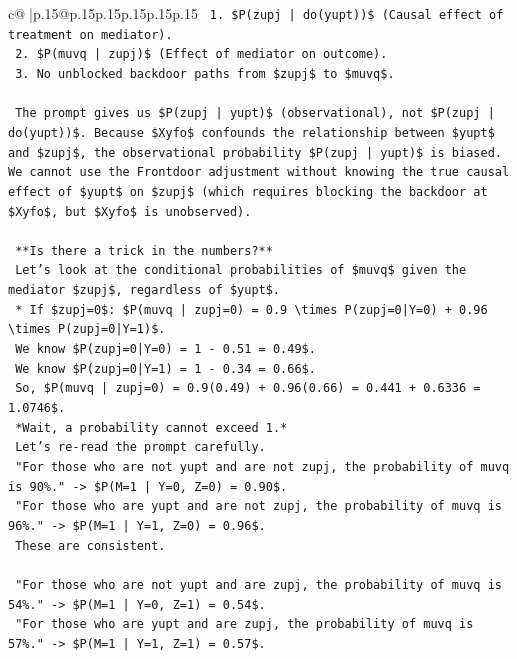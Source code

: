 \documentclass{article}
\begin{document}
{\begin{supertabular}{c@{$\;$}|p{.15\linewidth}@{}p{.15\linewidth}p{.15\linewidth}p{.15\linewidth}p{.15\linewidth}p{.15\linewidth}}
{{{\texttt{        1.  \$P(zupj | do(yupt))\$ (Causal effect of treatment on mediator).} \\
\texttt{        2.  \$P(muvq | zupj)\$ (Effect of mediator on outcome).} \\
\texttt{        3.  No unblocked backdoor paths from \$zupj\$ to \$muvq\$.} \\
\\ 
\texttt{    The prompt gives us \$P(zupj | yupt)\$ (observational), not \$P(zupj | do(yupt))\$. Because \$Xyfo\$ confounds the relationship between \$yupt\$ and \$zupj\$, the observational probability \$P(zupj | yupt)\$ is biased. We cannot use the Frontdoor adjustment without knowing the true causal effect of \$yupt\$ on \$zupj\$ (which requires blocking the backdoor at \$Xyfo\$, but \$Xyfo\$ is unobserved).} \\
\\ 
\texttt{    **Is there a trick in the numbers?**} \\
\texttt{    Let's look at the conditional probabilities of \$muvq\$ given the mediator \$zupj\$, regardless of \$yupt\$.} \\
\texttt{    *   If \$zupj=0\$: \$P(muvq | zupj=0) = 0.9 \textbackslash{}times P(zupj=0|Y=0) + 0.96 \textbackslash{}times P(zupj=0|Y=1)\$.} \\
\texttt{        We know \$P(zupj=0|Y=0) = 1 {-} 0.51 = 0.49\$.} \\
\texttt{        We know \$P(zupj=0|Y=1) = 1 {-} 0.34 = 0.66\$.} \\
\texttt{        So, \$P(muvq | zupj=0) = 0.9(0.49) + 0.96(0.66) = 0.441 + 0.6336 = 1.0746\$.} \\
\texttt{        *Wait, a probability cannot exceed 1.*} \\
\texttt{        Let's re{-}read the prompt carefully.} \\
\texttt{        "For those who are not yupt and are not zupj, the probability of muvq is 90\%." {-}> \$P(M=1 | Y=0, Z=0) = 0.90\$.} \\
\texttt{        "For those who are yupt and are not zupj, the probability of muvq is 96\%." {-}> \$P(M=1 | Y=1, Z=0) = 0.96\$.} \\
\texttt{        These are consistent.} \\
\\ 
\texttt{        "For those who are not yupt and are zupj, the probability of muvq is 54\%." {-}> \$P(M=1 | Y=0, Z=1) = 0.54\$.} \\
\texttt{        "For those who are yupt and are zupj, the probability of muvq is 57\%." {-}> \$P(M=1 | Y=1, Z=1) = 0.57\$.} \\
}}}
\end{supertabular}}
\end{document}
